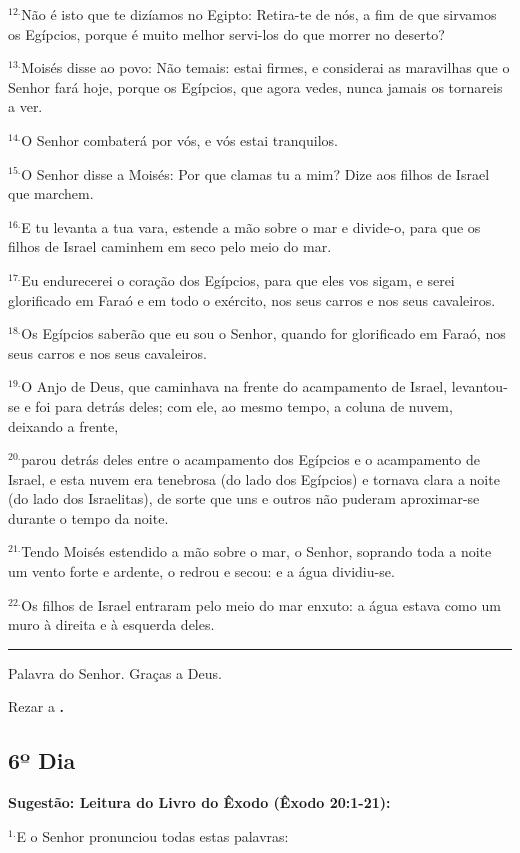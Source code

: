 \documentclass[a4paper,14pt]{extarticle} \usepackage[utf8]{inputenc}
\begin{document}
$^{12.}$Não é isto que te dizíamos no Egipto: Retira-te de nós, a fim de que sirvamos os Egípcios, porque é muito melhor servi-los do que morrer no deserto?

$^{13.}$Moisés disse ao povo: Não temais: estai firmes, e considerai as maravilhas que o Senhor fará hoje, porque os Egípcios, que agora vedes, nunca jamais os tornareis a ver.

$^{14.}$O Senhor combaterá por vós, e vós estai tranquilos.

$^{15.}$O Senhor disse a Moisés: Por que clamas tu a mim? Dize aos filhos de Israel que marchem.

$^{16.}$E tu levanta a tua vara, estende a mão sobre o mar e divide-o, para que os filhos de Israel caminhem em seco pelo meio do mar.

$^{17.}$Eu endurecerei o coração dos Egípcios, para que eles vos sigam, e serei glorificado em Faraó e em todo o exército, nos seus carros e nos seus cavaleiros.

$^{18.}$Os Egípcios saberão que eu sou o Senhor, quando for glorificado em Faraó, nos seus carros e nos seus cavaleiros.

$^{19.}$O Anjo de Deus, que caminhava na frente do acampamento de Israel, levantou-se e foi para detrás deles; com ele, ao mesmo tempo, a coluna de nuvem, deixando a frente,

$^{20.}$parou detrás deles entre o acampamento dos Egípcios e o acampamento de Israel, e esta nuvem era tenebrosa (do lado dos Egípcios) e tornava clara a noite (do lado dos Israelitas), de sorte que uns e outros não puderam aproximar-se durante o tempo da noite.

$^{21.}$Tendo Moisés estendido a mão sobre o mar, o Senhor, soprando toda a noite um vento forte e ardente, o redrou e secou: e a água dividiu-se.

$^{22.}$Os filhos de Israel entraram pelo meio do mar enxuto: a água estava como um muro à direita e à esquerda deles.


\par\noindent\rule{\textwidth}{0.4pt}

Palavra do Senhor. Graças a Deus.

Rezar a \textbf{.}
\subsection{6º Dia}
\textbf{Sugestão: Leitura do Livro do Êxodo (Êxodo 20:1-21):}

$^{1.}$E o Senhor pronunciou todas estas palavras:
\end{document}
